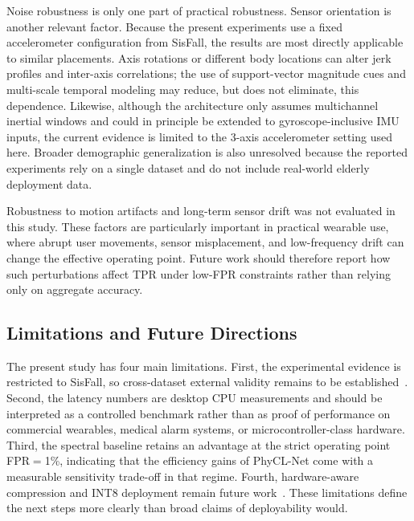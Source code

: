 \documentclass[jec]{acnsart}
\begin{document}
Noise robustness is only one part of practical robustness. Sensor orientation is another relevant factor. Because the present experiments use a fixed accelerometer configuration from SisFall, the results are most directly applicable to similar placements. Axis rotations or different body locations can alter jerk profiles and inter-axis correlations; the use of support-vector magnitude cues and multi-scale temporal modeling may reduce, but does not eliminate, this dependence. Likewise, although the architecture only assumes multichannel inertial windows and could in principle be extended to gyroscope-inclusive IMU inputs, the current evidence is limited to the 3-axis accelerometer setting used here. Broader demographic generalization is also unresolved because the reported experiments rely on a single dataset and do not include real-world elderly deployment data.

Robustness to motion artifacts and long-term sensor drift was not evaluated in this study. These factors are particularly important in practical wearable use, where abrupt user movements, sensor misplacement, and low-frequency drift can change the effective operating point. Future work should therefore report how such perturbations affect TPR under low-FPR constraints rather than relying only on aggregate accuracy.

\subsection{Limitations and Future Directions}

The present study has four main limitations. First, the experimental evidence is restricted to SisFall, so cross-dataset external validity remains to be established~\cite{Jia2024TransferLearningHAR,Wu2024DomainAdaptationContrastive}. Second, the latency numbers are desktop CPU measurements and should be interpreted as a controlled benchmark rather than as proof of performance on commercial wearables, medical alarm systems, or microcontroller-class hardware. Third, the spectral baseline retains an advantage at the strict operating point FPR${=}$1\%, indicating that the efficiency gains of PhyCL-Net come with a measurable sensitivity trade-off in that regime. Fourth, hardware-aware compression and INT8 deployment remain future work~\cite{Chu2024PostTrainingQuantization,Zhang2023DiffQuant,Gheorghe2021ModelBasedQuantization,Yu2023EdgeOptimization,Benoit2024PreImpactFall}. These limitations define the next steps more clearly than broad claims of deployability would.
\end{document}
